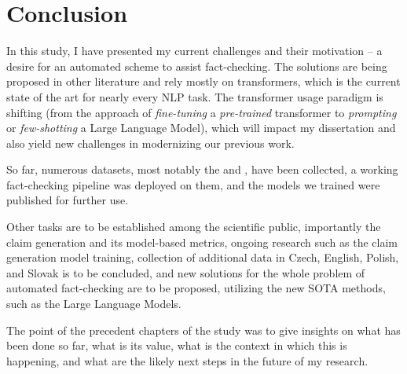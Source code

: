 
\chapter{Conclusion}
\label{chap:conclusion}
In this study, I have presented my current challenges and their motivation -- a desire for an automated scheme to assist fact-checking.
The solutions are being proposed in other literature and rely mostly on transformers, which is the current state of the art for nearly every NLP task.
The transformer usage paradigm is shifting (from the approach of \textit{fine-tuning} a \textit{pre-trained} transformer to \textit{prompting} or \textit{few-shotting} a Large Language Model), which will impact my dissertation and also yield new challenges in modernizing our previous work.

So far, numerous datasets, most notably the \FCZ and \CTK, have been collected, a working fact-checking pipeline was deployed on them, and the models we trained were published for further use.

Other tasks are to be established among the scientific public, importantly the claim generation and its model-based metrics, ongoing research such as the claim generation model training, collection of additional data in Czech, English, Polish, and Slovak is to be concluded, and new solutions for the whole problem of automated fact-checking are to be proposed, utilizing the new SOTA methods, such as the Large Language Models.

The point of the precedent chapters of the study was to give insights on what has been done so far, what is its value, what is the context in which this is happening, and what are the likely next steps in the future of my research.